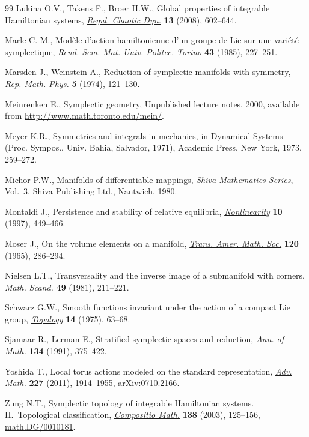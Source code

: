 \documentclass[pdftex]{sigma}
\numberwithin{equation}{section}
\begin{document}
\begin{thebibliography}{99}
Lukina O.V., Takens F., Broer H.W., Global properties of integrable
  {H}amiltonian systems, \href{http://dx.doi.org/10.1134/S1560354708060105}{\textit{Regul. Chaotic Dyn.}} \textbf{13} (2008),
  602--644.

Marle C.-M., Mod\`ele d'action hamiltonienne d'un groupe de {L}ie sur une
  vari\'et\'e symplectique, \textit{Rend. Sem. Mat. Univ. Politec. Torino}
  \textbf{43} (1985), 227--251.

Marsden J., Weinstein A., Reduction of symplectic manifolds with symmetry,
  \href{http://dx.doi.org/10.1016/0034-4877(74)90021-4}{\textit{Rep. Math. Phys.}} \textbf{5} (1974), 121--130.

Meinrenken E., Symplectic geometry, {U}npublished lecture notes, 2000,
  available from \url{http://www.math.toronto.edu/mein/}.

Meyer K.R., Symmetries and integrals in mechanics, in Dynamical Systems
  ({P}roc. {S}ympos., {U}niv. {B}ahia, {S}alvador, 1971), Academic Press, New
  York, 1973, 259--272.

Michor P.W., Manifolds of dif\/ferentiable mappings, \textit{Shiva Mathematics
  Series}, Vol.~3, Shiva Publishing Ltd., Nantwich, 1980.

Montaldi J., Persistence and stability of relative equilibria,
  \href{http://dx.doi.org/10.1088/0951-7715/10/2/009}{\textit{Nonlinearity}} \textbf{10} (1997), 449--466.

Moser J., On the volume elements on a manifold, \href{http://dx.doi.org/10.1090/S0002-9947-1965-0182927-5}{\textit{Trans. Amer. Math.
  Soc.}} \textbf{120} (1965), 286--294.

Nielsen L.T., Transversality and the inverse image of a submanifold with
  corners, \textit{Math. Scand.} \textbf{49} (1981), 211--221.

Schwarz G.W., Smooth functions invariant under the action of a compact {L}ie
  group, \href{http://dx.doi.org/10.1016/0040-9383(75)90036-1}{\textit{Topology}} \textbf{14} (1975), 63--68.

Sjamaar R., Lerman E., Stratif\/ied symplectic spaces and reduction, \href{http://dx.doi.org/10.2307/2944350}{\textit{Ann.
  of Math.}} \textbf{134} (1991), 375--422.

Yoshida T., Local torus actions modeled on the standard representation,
  \href{http://dx.doi.org/10.1016/j.aim.2011.04.007}{\textit{Adv. Math.}} \textbf{227} (2011), 1914--1955, \href{http://arxiv.org/abs/0710.2166}{arXiv:0710.2166}.

Zung N.T., Symplectic topology of integrable {H}amiltonian systems.
  {II}.~{T}opological classif\/ication, \href{http://dx.doi.org/10.1023/A:1026133814607}{\textit{Compositio Math.}} \textbf{138}
  (2003), 125--156, \href{http://arxiv.org/abs/math.DG/0010181}{math.DG/0010181}.

\end{thebibliography}\LastPageEnding
\end{document}
